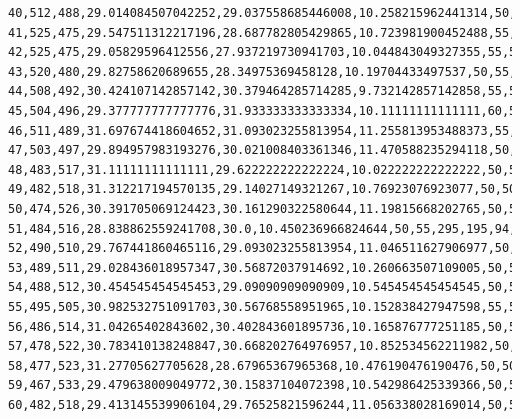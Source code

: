 \documentclass[authoryearcitations]{UoYCSproject}
\begin{document}
\begin{landscape}
\begin{verbatim}
40,512,488,29.014084507042252,29.037558685446008,10.258215962441314,50,55,299,196,91,74,76,42,54,27,35,28,22,26,12,9,7,2,0,0,0
41,525,475,29.547511312217196,28.687782805429865,10.723981900452488,55,50,309,182,89,77,65,60,43,42,26,29,25,19,13,12,5,4,0,0,0
42,525,475,29.05829596412556,27.937219730941703,10.044843049327355,55,50,308,196,78,76,66,55,56,39,28,30,17,19,18,4,8,1,1,0,0
43,520,480,29.82758620689655,28.34975369458128,10.19704433497537,50,55,295,179,94,63,72,55,53,52,33,25,21,17,17,14,5,4,1,0,0
44,508,492,30.424107142857142,30.379464285714285,9.732142857142858,55,50,312,172,97,50,58,68,47,50,42,29,18,16,21,9,6,4,1,0,0
45,504,496,29.377777777777776,31.933333333333334,10.11111111111111,60,50,325,160,98,59,40,58,69,33,41,38,24,16,18,11,4,4,2,0,0
46,511,489,31.697674418604652,31.093023255813954,11.255813953488373,55,55,320,159,87,70,51,38,59,63,29,39,29,19,15,12,5,3,2,0,0
47,503,497,29.894957983193276,30.021008403361346,11.470588235294118,50,55,335,177,71,64,63,46,39,46,50,29,25,21,17,6,8,2,1,0,0
48,483,517,31.11111111111111,29.622222222222224,10.022222222222222,50,50,327,182,89,45,55,60,43,39,42,41,19,21,16,12,5,4,0,0,0
49,482,518,31.312217194570135,29.14027149321267,10.76923076923077,50,50,320,176,101,64,49,45,56,36,39,36,26,17,17,10,3,4,1,0,0
50,474,526,30.391705069124423,30.161290322580644,11.19815668202765,50,50,306,193,90,74,54,45,42,48,35,33,29,20,14,8,5,3,1,0,0
51,484,516,28.838862559241708,30.0,10.450236966824644,50,55,295,195,94,66,60,54,43,44,43,28,21,26,12,10,5,3,1,0,0
52,490,510,29.767441860465116,29.093023255813954,11.046511627906977,50,50,299,182,100,67,61,53,52,42,37,34,24,14,16,8,7,2,2,0,0
53,489,511,29.028436018957347,30.56872037914692,10.260663507109005,50,50,300,170,101,70,58,58,44,55,37,34,26,13,17,9,4,2,2,0,0
54,488,512,30.454545454545453,29.09090909090909,10.545454545454545,50,55,306,177,92,66,55,58,57,37,46,34,25,18,14,9,2,3,1,0,0
55,495,505,30.982532751091703,30.56768558951965,10.152838427947598,55,50,325,166,90,61,59,56,49,43,37,35,27,17,15,9,7,2,2,0,0
56,486,514,31.04265402843602,30.402843601895736,10.165876777251185,50,50,303,191,78,70,57,50,52,43,43,37,25,19,14,5,8,4,1,0,0
57,478,522,30.783410138248847,30.668202764976957,10.852534562211982,50,50,310,177,82,58,67,52,45,51,41,40,28,21,9,9,6,2,1,1,0
58,477,523,31.27705627705628,28.67965367965368,10.476190476190476,50,50,323,173,103,47,53,61,45,39,41,32,32,18,19,3,6,4,0,1,0
59,467,533,29.479638009049772,30.15837104072398,10.542986425339366,50,55,313,191,87,69,46,45,55,35,37,40,21,31,12,10,4,2,1,1,0
60,482,518,29.413145539906104,29.76525821596244,11.056338028169014,50,50,298,199,90,70,56,50,32,52,30,33,32,18,24,9,3,3,0,1,0

\end{verbatim}
\end{landscape}
\end{document}
